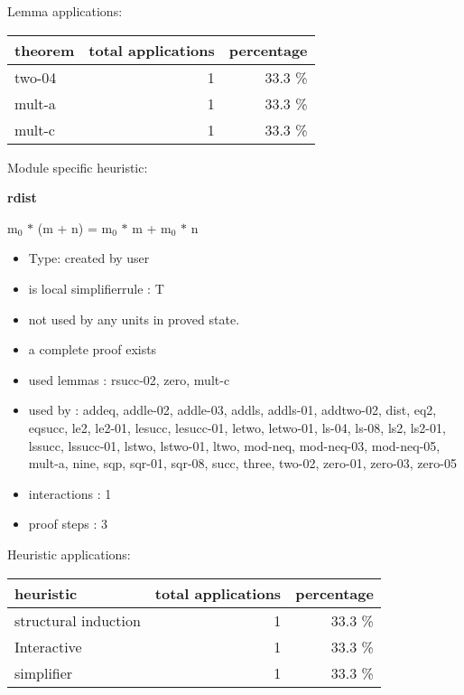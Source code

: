 \documentclass[a4paper]{article}
\begin{document}
Lemma applications:

\begin{supertabular}{l|r|r}
theorem	        & total applications & percentage \\ \hline
two-04 & 1 & 33.3 \% \\
mult-a & 1 & 33.3 \% \\
mult-c & 1 & 33.3 \% \\

\end{supertabular}

Module specific heuristic:

\pagebreak

{\LARGE\bf rdist}\label{lemma-rdist}

\medskip

 \Fol $\mbox{m}_{0}$ $*$ (m + n) = $\mbox{m}_{0}$ $*$ m + $\mbox{m}_{0}$ $*$ n

\begin{itemize}

\item Type: created by user

\item is local simplifierrule : T
\item not used by any units in proved state.
\item       a complete proof exists
\item       used lemmas  : rsucc-02, zero, mult-c
\item       used by      : addeq, addle-02, addle-03, addls, addls-01, addtwo-02, dist, eq2, eqsucc, le2, le2-01, lesucc, lesucc-01, letwo, letwo-01, ls-04, ls-08, ls2, ls2-01, lssucc, lssucc-01, lstwo, lstwo-01, ltwo, mod-neq, mod-neq-03, mod-neq-05, mult-a, nine, sqp, sqr-01, sqr-08, succ, three, two-02, zero-01, zero-03, zero-05
\item       interactions : 1
\item       proof steps  : 3
\end{itemize}

\medskip


Heuristic applications:

\begin{supertabular}{l|r|r}
heuristic	& total applications & percentage \\ \hline
structural induction & 1 & 33.3 \% \\
Interactive & 1 & 33.3 \% \\
simplifier & 1 & 33.3 \% \\

\end{supertabular}
\end{document}
